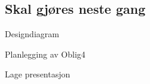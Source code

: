 \documentclass[11pt]{meetingmins}
\begin{document}
\maketitle
\subsection{}


\subsection{Skal gjøres neste gang}
\begin{items}
\item
Designdiagram
\item
Planlegging av Oblig4
\item
Lage presentasjon
\end{items}
\vspace{1em}
\end{document}
